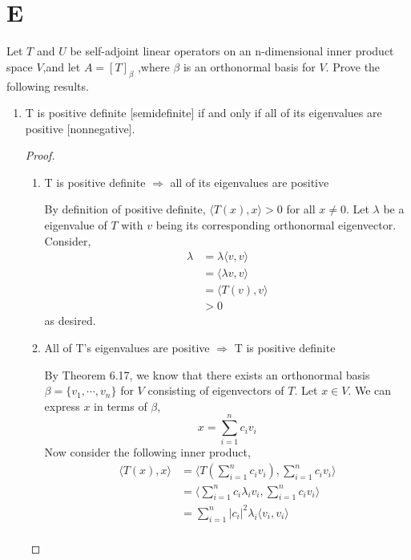 \documentclass[11pt]{scrartcl}
\begin{document}
\section{E}
Let $T$ and $U$ be self-adjoint linear operators on an n-dimensional inner product space $V$,and let $A = [T]_\beta$ ,where
$\beta$ is an orthonormal basis for $V$. Prove the following results.
\begin{enumerate}[label=\alph*.]
	\item {
	      T is positive definite [semidefinite] if and only if all of its eigenvalues are positive [nonnegative].
	      \begin{proof}\
		      \begin{enumerate}[label=\roman*.]
			      \item {
			            T is positive definite $\Rightarrow$ all of its eigenvalues are positive\par
			            By definition of positive definite, $\langle T(x),x \rangle > 0$ for all $x \neq 0$.
			            Let $\lambda$ be a eigenvalue of $T$ with $v$ being its corresponding orthonormal eigenvector.
			            Consider,
			            \begin{align*}
				            \lambda & = \lambda \langle v,v \rangle \\
				                    & = \langle \lambda v,v \rangle \\
				                    & = \langle T(v),v \rangle      \\
				                    & > 0
			            \end{align*}
			            as desired.
			            }
			      \item {
			            All of T's eigenvalues are positive $\Rightarrow$  T is positive definite \par
			            By Theorem 6.17, we know that there exists an orthonormal basis
			            $\beta = \{v_1, \cdots, v_n\}$ for $V$ consisting of eigenvectors of $T$.
			            Let $x \in V$. We can express $x$ in terms of $\beta$,
			            $$ x = \sum_{i = 1}^n c_iv_i$$
			            Now consider the following inner product,
			            \begin{align*}
				            \langle T(x),x \rangle & = \langle T(\sum_{i = 1}^n c_iv_i),\sum_{i = 1}^n c_iv_i \rangle       \\
				                                   & = \langle \sum_{i = 1}^n c_i\lambda_iv_i,\sum_{i = 1}^n c_iv_i \rangle \\
				                                   & = \sum_{i = 1}^n |c_i|^2 \lambda_i  \langle v_i,v_i \rangle            \\

\end{align*}}
\end{enumerate}
\end{proof}}
\end{enumerate}
\end{document}
